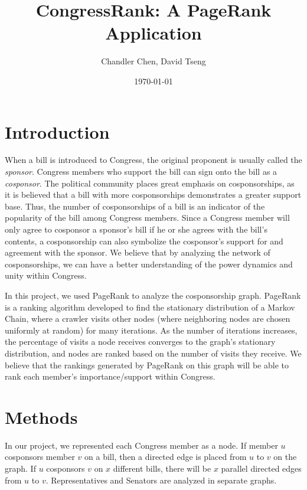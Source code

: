 \documentclass[11pt]{article}
\begin{document}
\title{CongressRank: A PageRank Application}
\author{Chandler Chen, David Tseng}
\date{\today}
\maketitle

\section*{Introduction}
When a bill is introduced to Congress, the original proponent is usually called the \textit{sponsor}. Congress members who support the bill can sign onto the bill as a \textit{cosponsor}. The political community places great emphasis on cosponsorships, as it is believed that a bill with more cosponsorships demonstrates a greater support base. Thus, the number of cosponsorships of a bill is an indicator of the popularity of the bill among Congress members. Since a Congress member will only agree to cosponsor a sponsor's bill if he or she agrees with the bill's contents, a cosponsorship can also symbolize the cosponsor's support for and agreement with the sponsor. We believe that by analyzing the network of cosponsorships, we can have a better understanding of the power dynamics and unity within Congress. 

In this project, we used PageRank to analyze the cosponsorship graph. PageRank is a ranking algorithm developed to find the stationary distribution of a Markov Chain, where a crawler visits other nodes (where neighboring nodes are chosen uniformly at random) for many iterations. As the number of iterations increases, the percentage of visits a node receives converges to the graph's stationary distribution, and nodes are ranked based on the number of visits they receive. We believe that the rankings generated by PageRank on this graph will be able to rank each member's importance/support within Congress. 




\section*{Methods}
In our project, we represented each Congress member as a node. If member $u$ cosponsors member $v$ on a bill, then a directed edge is placed from $u$ to $v$ on the graph. If $u$ cosponsors $v$ on $x$ different bills, there will be $x$ parallel directed edges from $u$ to $v$. Representatives and Senators are analyzed in separate graphs. 
\end{document}
